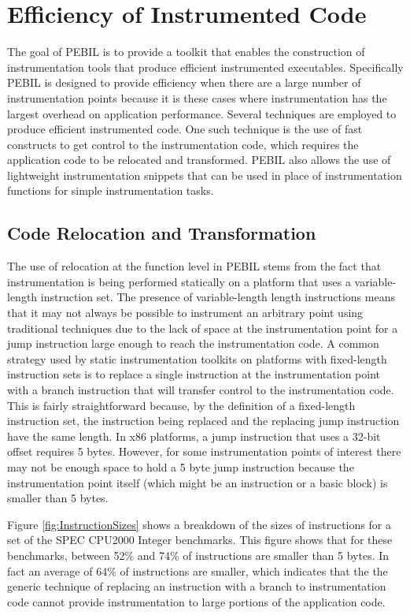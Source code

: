 \section{Efficiency of Instrumented Code}
\label{sec:Efficiency}

The goal of PEBIL is to provide a toolkit that enables the construction of
instrumentation tools that produce efficient instrumented executables.
Specifically PEBIL is designed to provide efficiency when there are a large
number of instrumentation points because it is these cases where instrumentation
has the largest overhead on application performance. Several techniques are
employed to produce efficient instrumented code. One such technique is the use
of fast constructs to get control to the instrumentation code, which requires
the application code to be relocated and transformed. PEBIL also allows the use
of lightweight instrumentation snippets that can be used in place of
instrumentation functions for simple instrumentation tasks.

\subsection{Code Relocation and Transformation}
\label{Subsection:Relocation}
The use of relocation at the function level in PEBIL stems from the fact that
instrumentation is being performed statically on a platform that uses a
variable-length instruction set. The presence of variable-length length
instructions means that it may not always be possible to instrument an arbitrary
point using traditional techniques due to the lack of space at the
instrumentation point for a jump instruction large enough to reach the
instrumentation code. A common strategy used by static instrumentation toolkits
on platforms with fixed-length instruction sets is to replace a single
instruction at the instrumentation point with a branch instruction that will
transfer control to the instrumentation code. This is fairly straightforward
because, by the definition of a fixed-length instruction set, the instruction
being replaced and the replacing jump instruction have the same length. In x86
platforms, a jump instruction that uses a 32-bit offset requires 5 bytes.
However, for some instrumentation points of interest there may not be enough
space to hold a 5 byte jump instruction because the instrumentation point itself
(which might be an instruction or a basic block) is smaller than 5 bytes. 

Figure \ref{fig:InstructionSizes} shows a breakdown of the sizes of instructions
for a set of the SPEC CPU2000 Integer benchmarks. This figure shows that for
these benchmarks, between 52\% and 74\% of instructions are smaller than 5
bytes. In fact an average of 64\% of instructions are smaller, which indicates
that the the generic technique of replacing an instruction with a branch to
instrumentation code cannot provide instrumentation to large portions of the application
code.

